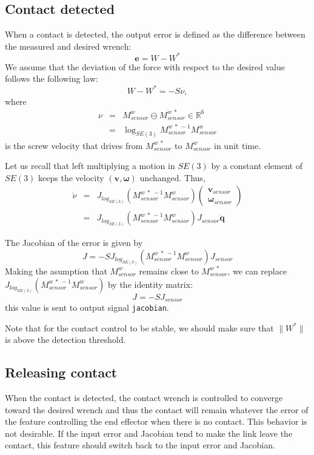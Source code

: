 \documentclass{article}
\newcommand{\oM}[2]{M^{#1}_{#2}}
\newcommand\wrench{W}
\newcommand\wrenchdes{W^{*}}
\newcommand\dconf{\mathbf{\dot{q}}}
\begin{document}
\subsection{Contact detected}\label{subsec:contact detected}

When a contact is detected, the output error is defined as the difference between the measured and desired wrench:
$$
\bm{e} = \wrench - \wrenchdes
$$
We assume that the deviation of the force with respect to the desired value follows the following law:
$$
\wrench - \wrenchdes = -S\nu,
$$
where
\begin{eqnarray*}
  \nu &=& \oM{w}{sensor} \ominus \oM{w\ *}{sensor}\in\mathbb{R}^{6}\\
  &=& \log_{SE(3)} \oM{w\ *\ -1}{sensor} \oM{w}{sensor}
\end{eqnarray*}
is the screw velocity that drives from $\oM{w\ *}{sensor}$ to $\oM{w}{sensor}$ in unit time.

Let us recall that left multiplying a motion in $SE(3)$ by a constant element of $SE(3)$ keeps the velocity $(\mathbf{v},\bm{\omega})$ unchanged. Thus,
\begin{eqnarray*}
  \dot{\nu} &=& J_{log_{SE(3)}}(\oM{w\ *\ -1}{sensor} \oM{w}{sensor})\left(\begin{array}{c}\mathbf{v}_{sensor}\\ \bm{\omega}_{sensor}\end{array}\right)\\
  &=& J_{log_{SE(3)}}(\oM{w\ *\ -1}{sensor} \oM{w}{sensor}) J_{sensor}\dconf
\end{eqnarray*}

The Jacobian of the error is given by
$$
J = -S J_{log_{SE(3)}}(\oM{w\ *\ -1}{sensor} \oM{w}{sensor}) J_{sensor}
$$
Making the asumption that $\oM{w}{sensor}$ remains close to $\oM{w\ *}{sensor}$, we can replace $J_{log_{SE(3)}}(\oM{w\ *\ -1}{sensor} \oM{w}{sensor})$ by the identity matrix:
$$
J = -S J_{sensor}
$$
this value is sent to output signal \texttt{jacobian}.

Note that for the contact control to be stable, we should make sure that
$\|\wrenchdes\|$ is above the detection threshold.

\subsection{Releasing contact}

When the contact is detected, the contact wrench is controlled to converge toward the desired wrench and thus the contact will remain whatever the error of the feature controlling the end effector when there is no contact.
This behavior is not desirable. If the input error and Jacobian tend to make
the link leave the contact, this feature should switch back to the input error and Jacobian.
\end{document}
